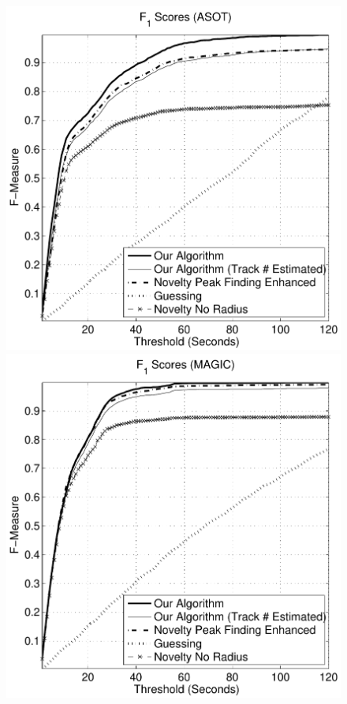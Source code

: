 \documentclass[twocolumn]{article}
\begin{document}
\begin{figure}
	\begin{center}
		
		\begin{minipage}[t]{0.45\linewidth}
			\begin{center}
				\includegraphics[scale=0.5]{images/fscores/fasot}
			\end{center}
		\end{minipage}
		\begin{minipage}[t]{0.45\linewidth}
			\begin{center}
				\includegraphics[scale=0.5]{images/fscores/magic}
			\end{center}
		\end{minipage}
		\bigskip
		

\end{center}
\end{figure}
\end{document}
